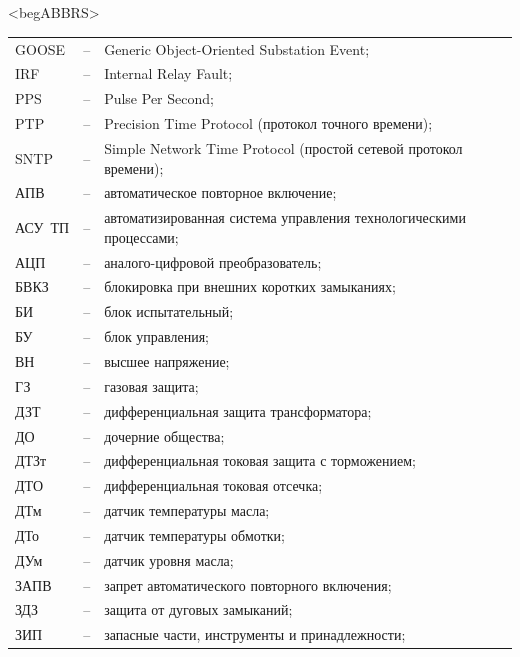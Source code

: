 \color{unimain}\section*{}
{\color{white}\fontsize{0.1pt}{0.1pt}\selectfont<begABBRS>}
\color{black}
\begin{longtable}{>{\raggedright\arraybackslash}m{2cm}>{\raggedright\arraybackslash}m{0.5cm}>{\raggedright\arraybackslash}m{20cm}}
\endfirsthead\endhead\endfoot\endlastfoot
GOOSE & -- & Generic Object-Oriented Substation Event; \\
IRF & -- & Internal Relay Fault; \\
PPS & -- & Pulse Per Second; \\
PTP & -- & Precision Time Protocol (протокол точного времени); \\
SNTP & -- & Simple Network Time Protocol (простой сетевой протокол времени); \\
АПВ & -- & автоматическое повторное включение; \\
АСУ~ТП & -- & автоматизированная система управления технологическими процессами; \\
АЦП & -- & аналого-цифровой преобразователь; \\
БВКЗ & -- & блокировка при внешних коротких замыканиях; \\
БИ & -- & блок испытательный; \\
БУ & -- & блок управления; \\
ВН & -- & высшее напряжение; \\
ГЗ & -- & газовая защита; \\
ДЗТ & -- & дифференциальная защита трансформатора; \\
ДО & -- & дочерние общества; \\
ДТЗт & -- & дифференциальная токовая защита с торможением; \\
ДТО & -- & дифференциальная токовая отсечка; \\
ДТм & -- & датчик температуры масла; \\
ДТо & -- & датчик температуры обмотки; \\
ДУм & -- & датчик уровня масла; \\
ЗАПВ & -- & запрет автоматического повторного включения; \\
ЗДЗ & -- & защита от дуговых замыканий; \\
ЗИП & -- & запасные части, инструменты и принадлежности; \\

\end{longtable}
